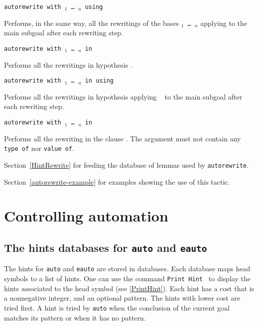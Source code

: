 \begin{coq_example*}
\begin{Variant}
\item {\tt autorewrite with \ident$_1$ \mbox{\dots} \ident$_n$ using \tac}

Performs, in the same way, all the rewritings of the bases {\tt \ident$_1$
\mbox{\dots} \ident$_n$} applying {\tt \tac} to the main subgoal after each
rewriting step.

\item {\tt autorewrite with \ident$_1$ \mbox{\dots} \ident$_n$ in \qualid}

  Performs all the rewritings in hypothesis {\qualid}.
\item {\tt autorewrite with \ident$_1$ \mbox{\dots} \ident$_n$ in {\qualid} using \tac}

  Performs all  the rewritings  in hypothesis {\qualid}  applying {\tt
    \tac} to the main subgoal after each rewriting step.

\item {\tt autorewrite with \ident$_1$ \mbox{\dots} \ident$_n$ in }

  Performs all the rewriting  in the clause .
  The  argument must not contain any \texttt{type of} nor \texttt{value of}.

\end{Variant}

\SeeAlso Section~\ref{HintRewrite} for feeding the database of lemmas used by {\tt autorewrite}.

\SeeAlso Section~\ref{autorewrite-example} for examples showing the use of
this tactic.


\section{Controlling automation}

\subsection{The hints databases for {\tt auto} and {\tt eauto}}
\label{Hints-databases}

The hints for \texttt{auto} and \texttt{eauto} are stored in
databases.  Each database maps head symbols to a list of hints. One can
use the command \texttt{Print Hint \ident} to display the hints
associated to the head symbol \ident{} (see \ref{PrintHint}). Each
hint has a cost that is a nonnegative integer, and an optional pattern.
The hints with lower cost are tried first. A hint is tried by
\texttt{auto} when the conclusion of the current goal
matches its pattern or when it has no pattern.


\end{coq_example*}
